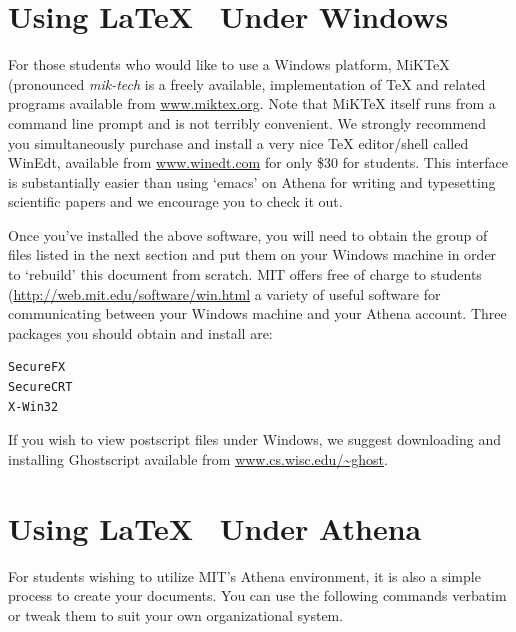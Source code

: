 \clearpage
\appendix



\section{Using \LaTeX~ Under Windows}
For those students who would like to use a Windows platform, MiKTeX
(pronounced \emph{mik-tech} is a freely available, implementation of
TeX and related programs available from \url{www.miktex.org}. Note
that MiKTeX itself runs from a command line prompt and is not terribly
convenient.  We strongly recommend you simultaneously purchase and
install a very nice TeX editor/shell called WinEdt, available from
\url{www.winedt.com} for only \$30 for students. This interface is
substantially easier than using `emacs' on Athena for writing and
typesetting scientific papers and we encourage you to check it out.

Once you've installed the above software, you will need to obtain the
group of files listed in the next section and put them on your Windows
machine in order to `rebuild' this document from scratch.  MIT offers
free of charge to students (\url{http://web.mit.edu/software/win.html}
a variety of useful software for communicating between your Windows
machine and your Athena account.  Three packages you should obtain and
install are:
\begin{verbatim}
SecureFX
SecureCRT
X-Win32
\end{verbatim}

If you wish to view postscript files under Windows, we
suggest downloading and installing Ghostscript available from
\url{www.cs.wisc.edu/~ghost}.





\section{Using \LaTeX~ Under Athena}
For students wishing to utilize MIT's Athena environment, it is also
a simple process to create your documents.  You can use the following
commands verbatim or tweak them to suit your own organizational system.

